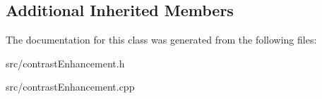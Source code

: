 \subsection*{Additional Inherited Members}


The documentation for this class was generated from the following files\+:\begin{DoxyCompactItemize}
\item 
src/contrast\+Enhancement.\+h\item 
src/contrast\+Enhancement.\+cpp\end{DoxyCompactItemize}
